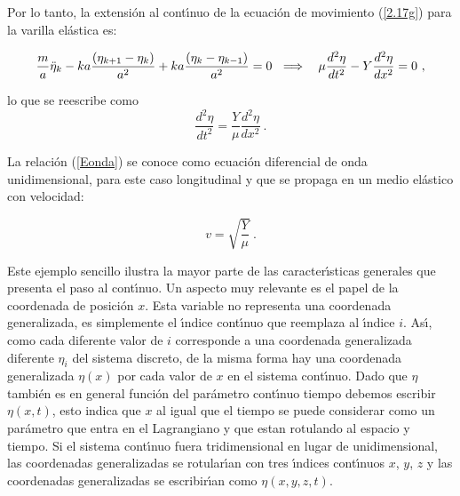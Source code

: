 \noindent
Por lo tanto, la extensi\'{o}n al cont\'{\i}nuo de la ecuaci\'{o}n de
movimiento (\ref{2.17g}) para la varilla el\'{a}stica es:

\begin{equation}
\frac{m}{a}\ddot{\eta}_{k}-ka\frac{\left( \eta _{k+1}-\eta _{k}\right) }{%
a^{2}}+ka\frac{\left( \eta _{k}-\eta _{k-1}\right) }{a^{2}}=0\ \implies ~\
\mu \frac{d^{2}\eta }{dt^{2}}-Y\frac{d^{2}\eta }{dx^{2}}=0~,
\label{2.17k}
\end{equation}

\noindent lo que se reescribe como
\begin{equation}
\frac{d^{2}\eta }{dt^{2}}=\frac{Y}{\mu }\frac{d^{2}\eta }{dx^{2}}~.
\label{Eonda}
\end{equation}

\noindent
La relaci\'{o}n (\ref{Eonda}) se conoce como ecuaci\'{o}n diferencial de onda unidimensional, para este caso longitudinal y que se propaga en un medio el\'{a}stico con velocidad:

\begin{equation*}
v=\sqrt{\frac{Y}{\mu}}~.
\end{equation*}

\vspace{1cm}
Este ejemplo sencillo ilustra la mayor parte de las caracter\'{\i}sticas generales que presenta el paso al cont\'{\i}nuo. Un aspecto muy relevante es el papel de la coordenada de posici\'{o}n $x$. Esta variable no representa una coordenada generalizada, es simplemente el \'{\i}ndice cont\'{\i}nuo que reemplaza al \'{\i}ndice $i$. As\'{\i}, como cada diferente valor de $i$ corresponde a una coordenada generalizada diferente $\eta _{i}$ del sistema discreto, de la misma forma hay una coordenada generalizada $\eta \left(x\right) $ por cada valor de $x$ en el sistema cont\'{\i}nuo. Dado que $\eta$ tambi\'{e}n es en general funci\'{o}n del par\'{a}metro cont\'{\i}nuo tiempo debemos escribir $\eta \left( x,t\right) $, esto indica que $x$ al igual que el tiempo se puede considerar como un par\'{a}metro que entra en el Lagrangiano y que estan rotulando al espacio y tiempo. Si el sistema cont\'{\i}nuo fuera tridimensional en lugar de unidimensional, las coordenadas generalizadas se rotular\'{\i}an con tres \'{\i}ndices cont\'{\i}nuos $x$, $y$, $z$ y las coordenadas generalizadas se escribir\'{\i}an como $\eta
(x,y,z,t)$.\\

